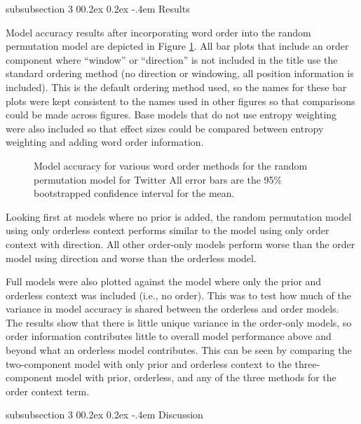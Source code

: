 \documentclass[man,floatsintext,donotrepeattitle]{apa6}
\makeatletter
\renewcommand{\subsubsection}{%
  \@startsection
  {subsubsection}%
  {3}%
  {\parindent}%
  {0\baselineskip \@plus 0.2ex \@minus 0.2ex}%
  {-.4em}%
  {\normalfont\normalsize\bfseries\addperi}}
\makeatother
\begin{document}
\subsubsection{Results}

Model accuracy results after incorporating word order into the random permutation model are depicted in Figure \ref{figContextOrder}.
All bar plots that include an order component where ``window'' or ``direction'' is not included in the title use the standard ordering method (no direction or windowing, all position information is included).
This is the default ordering method used, so the names for these bar plots were kept consistent to the names used in other figures so that comparisons could be made across figures.
Base models that do not use entropy weighting were also included so that effect sizes could be compared between entropy weighting and adding word order information.

\begin{figure}[!htbp]
  \caption{
    Model accuracy for various word order methods for the random permutation model for Twitter
    All error bars are the 95\% bootstrapped confidence interval for the mean. 
  }
  \label{figContextOrder}
\end{figure}

Looking first at models where no prior is added, the random permutation model using only orderless context performs similar to the model using only order context with direction.
All other order-only models perform worse than the order model using direction and worse than the orderless model.

Full models were also plotted against the model where only the prior and orderless context was included (i.e., no order).
This was to test how much of the variance in model accuracy is shared between the orderless and order models.
The results show that there is little unique variance in the order-only models, so order information contributes little to overall model performance above and beyond what an orderless model contributes.
This can be seen by comparing the two-component model with only prior and orderless context to the three-component model with prior, orderless, and any of the three methods for the order context term.

\subsubsection{Discussion}
\end{document}
